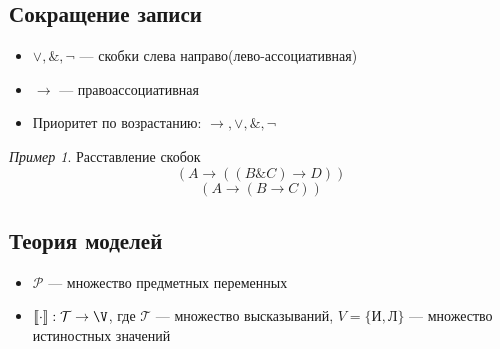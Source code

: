 \documentclass[english]{article}
\newcommand{\llb}{\llbracket}
\newcommand{\rrb}{\rrbracket}
\theoremstyle{plain}
\theoremstyle{remark}
\newtheorem*{examp}{Пример}
\theoremstyle{definition}
\begin{document}
\subsection{Сокращение записи}
\label{sec:org866f94d}
\begin{itemize}
\item \(\vee, \&, \neg\) --- скобки слева направо(лево-ассоциативная)
\item \(\to\) --- правоассоциативная
\item Приоритет по возрастанию: \(\to, \vee, \&, \neg\)
\end{itemize}
\begin{examp}
Расставление скобок
\[ \left(A \to \left( \left(B \& C\right) \to D\right)\right) \]
\[ \left(A \to \left(B \to C\right)\right) \]
\end{examp}
\subsection{Теория моделей}
\label{sec:orgcdd3865}
\begin{itemize}
\item \(\mathcal{P}\) --- множество предметных переменных
\item \(\llb\cdot\rrb: \mathcal{T} \to \V\), где \(\mathcal{T}\) --- множество высказываний, \(V = \{\text{И}, \text{Л}\}\) --- множество истиностных значений
\end{itemize}
\end{document}
